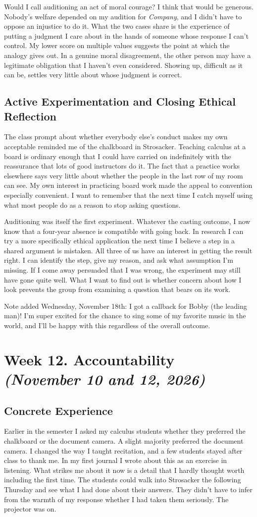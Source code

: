 \documentclass[12pt,letterpaper]{article}
\newcommand{\entry}[1]{\clearpage\section{#1}}
\begin{document}
Would I call auditioning an act of moral courage? I think that would be generous. Nobody's welfare depended on my audition for \textit{Company}, and I didn't have to oppose an injustice to do it. What the two cases share is the experience of putting a judgment I care about in the hands of someone whose response I can't control. My lower score on multiple values suggests the point at which the analogy gives out. In a genuine moral disagreement, the other person may have a legitimate obligation that I haven't even considered. Showing up, difficult as it can be, settles very little about whose judgment is correct.

\subsection{Active Experimentation and Closing Ethical Reflection}
The class prompt about whether everybody else's conduct makes my own acceptable reminded me of the chalkboard in Strosacker. Teaching calculus at a board is ordinary enough that I could have carried on indefinitely with the reassurance that lots of good instructors do it. The fact that a practice works elsewhere says very little about whether the people in the last row of my room can see. My own interest in practicing board work made the appeal to convention especially convenient. I want to remember that the next time I catch myself using what most people do as a reason to stop asking questions.

Auditioning was itself the first experiment. Whatever the casting outcome, I now know that a four-year absence is compatible with going back. In research I can try a more specifically ethical application the next time I believe a step in a shared argument is mistaken. All three of us have an interest in getting the result right. I can identify the step, give my reason, and ask what assumption I'm missing. If I come away persuaded that I was wrong, the experiment may still have gone quite well. What I want to find out is whether concern about how I look prevents the group from examining a question that bears on its work.

Note added Wednesday, November 18th: I got a callback for Bobby (the leading man)! I'm super excited for the chance to sing some of my favorite music in the world, and I'll be happy with this regardless of the overall outcome.
\entry{Week 12. Accountability \textit{(November 10 and 12, 2026)}}
\subsection{Concrete Experience}
Earlier in the semester I asked my calculus students whether they preferred the chalkboard or the document camera. A slight majority preferred the document camera. I changed the way I taught recitation, and a few students stayed after class to thank me. In my first journal I wrote about this as an exercise in listening. What strikes me about it now is a detail that I hardly thought worth including the first time. The students could walk into Strosacker the following Thursday and see what I had done about their answers. They didn't have to infer from the warmth of my response whether I had taken them seriously. The projector was on.
\end{document}
